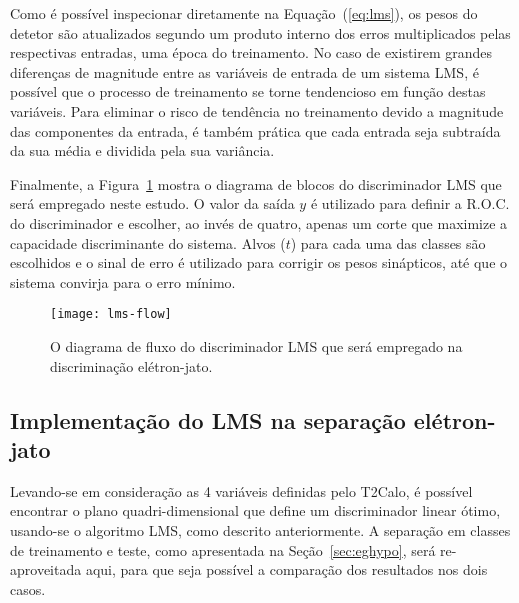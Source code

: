 Como é possível inspecionar diretamente na Equação~(\ref{eq:lms}), os pesos do
detetor são atualizados segundo um produto interno dos erros multiplicados
pelas respectivas entradas, uma época do treinamento. No caso de existirem
grandes diferenças de magnitude entre as variáveis de entrada de um sistema
LMS, é possível que o processo de treinamento se torne tendencioso em função
destas variáveis. Para eliminar o risco de tendência no treinamento devido a
magnitude das componentes da entrada, é também prática que cada entrada seja
subtraída da sua média e dividida pela sua variância.

Finalmente, a Figura~\ref{fig:lms-flow} mostra o diagrama de blocos do
discriminador LMS que será empregado neste estudo. O valor da saída $y$ é
utilizado para definir a R.O.C. do discriminador e escolher, ao invés de
quatro, apenas um corte que maximize a capacidade discriminante do
sistema. Alvos ($t$) para cada uma das classes são escolhidos e o sinal de
erro é utilizado para corrigir os pesos sinápticos, até que o sistema convirja
para o erro mínimo.

\begin{figure}
\begin{center}
\texttt{[image: lms-flow]}
\end{center}
\caption{O diagrama de fluxo do discriminador LMS que será empregado na
discriminação elétron-jato.}
\label{fig:lms-flow}
\end{figure}

\subsection{Implementação do LMS na separação e\-lé\-tron-jato}
\label{sec:lms-ej}

Levando-se em consideração as 4 variáveis definidas pelo T2Calo, é possível
encontrar o plano quadri-dimensional que define um discriminador linear ótimo,
usando-se o algoritmo LMS, como descrito anteriormente. A separação em classes
de treinamento e teste, como apresentada na Seção~\ref{sec:eghypo}, será
re-aproveitada aqui, para que seja possível a comparação dos resultados nos
dois casos.

